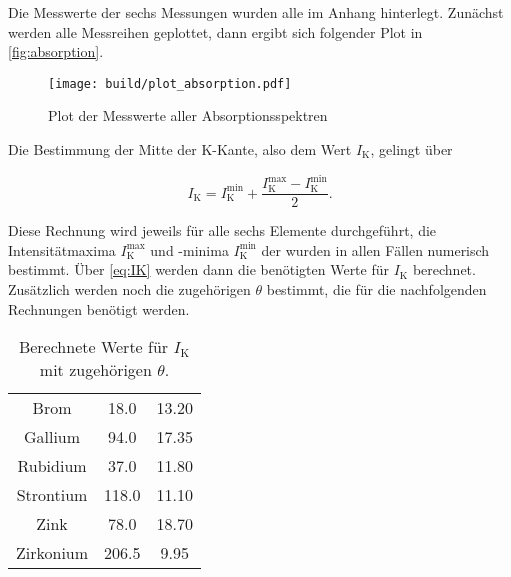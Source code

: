 Die Messwerte der sechs Messungen wurden alle im Anhang hinterlegt.
Zunächst werden alle Messreihen geplottet, dann ergibt sich folgender Plot in \autoref{fig:absorption}.

\begin{figure}
    \centering
    \texttt{[image: build/plot\_absorption.pdf]}
    \caption{Plot der Messwerte aller Absorptionsspektren}
    \label{fig:absorption}
\end{figure}

Die Bestimmung der Mitte der K-Kante, also dem Wert $I_\text{K}$, gelingt über 

\begin{equation}
    I_\text{K} = I^\text{min}_\text{K} + \frac{I^\text{max}_\text{K} - I^\text{min}_\text{K}}{2}.
    \label{eq:IK}
\end{equation}

Diese Rechnung wird jeweils für alle sechs Elemente durchgeführt, die Intensitätmaxima $I^{\text{max}}_\text{K}$ und -minima $I^{\text{min}}_\text{K}$ der  wurden in allen Fällen numerisch bestimmt.
Über \eqref{eq:IK} werden dann die benötigten Werte für $I_\text{K}$ berechnet.
Zusätzlich werden noch die zugehörigen $\theta$ bestimmt, die für die nachfolgenden Rechnungen benötigt werden.

\begin{table}
    \centering
    \caption{Berechnete Werte für $I_\text{K}$ mit zugehörigen $\theta$.}
    \label{tab:IK}
    \begin{tabular}{c S[table-format=3.1] S[table-format=2.2]}
        \toprule
          &  & \tableSI{\theta}{\degree}\\
        \midrule
        Brom & 18.0 & 13.20\\
        Gallium & 94.0 & 17.35\\
        Rubidium & 37.0 & 11.80\\
        Strontium & 118.0 & 11.10\\
        Zink & 78.0 & 18.70\\
        Zirkonium & 206.5 & 9.95\\
        \bottomrule
    \end{tabular}
\end{table}